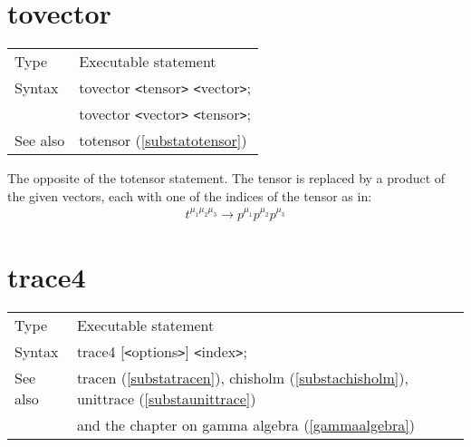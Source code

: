 
\vspace{10mm}


\section{tovector}
\label{substatovector}

\noindent \begin{tabular}{ll}
Type & Executable statement\\
Syntax & tovector {\tt<}tensor{\tt>} {\tt<}vector{\tt>}; \\
       & tovector {\tt<}vector{\tt>} {\tt<}tensor{\tt>};
\\ See also & totensor (\ref{substatotensor})
\end{tabular} \vspace{4mm}

\noindent The opposite of the totensor 
statement. The tensor is replaced by a product of the given vectors, each 
with one of the indices of the tensor as in:
\begin{eqnarray}
    t^{\mu_1\mu_2\mu_3} \rightarrow p^{\mu_1}p^{\mu_2}p^{\mu_3} \nonumber
\end{eqnarray}\vspace{10mm}
\setcounter{equation}{7}


\section{trace4}
\label{substatrace}

\noindent \begin{tabular}{ll}
Type & Executable statement\\
Syntax & trace4 [{\tt<}options{\tt>}] {\tt<}index{\tt>}; \\
See also & tracen (\ref{substatracen}), chisholm (\ref{substachisholm}),
    unittrace (\ref{substaunittrace}) \\ &
    and the chapter on gamma algebra (\ref{gammaalgebra})
\end{tabular} \vspace{4mm}

